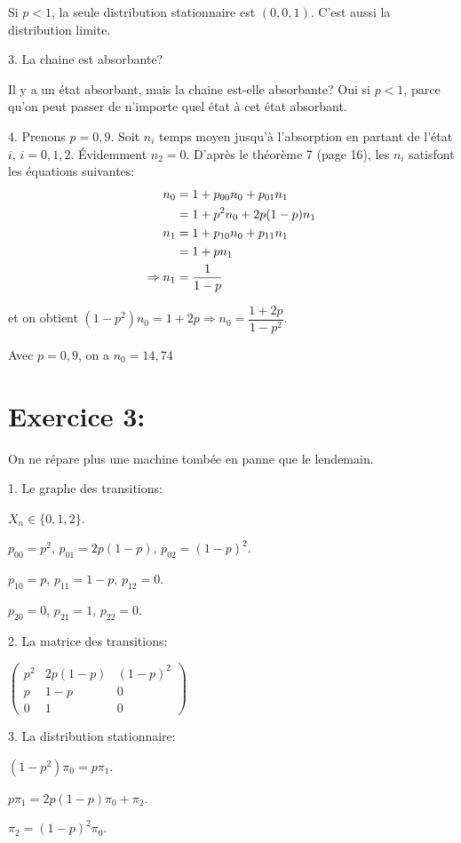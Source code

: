 \documentclass[a4paper,twoside,12pt]{article}
\begin{document}
Si $p<1$, la seule distribution stationnaire est $(0, 0, 1)$. C'est aussi la distribution limite.

3. La chaine est absorbante?

Il y a un état absorbant, mais la chaine est-elle absorbante? Oui si $p < 1$, parce qu'on peut passer de n'importe quel état à cet état absorbant.

4. Prenons $p = 0,9$. Soit $n_i$ temps moyen jusqu'à l'absorption en partant de l'état $i$, $i = 0, 1, 2$. Évidemment $n_2 = 0$. D'après le théorème 7 (page 16), les $n_i$ satisfont les équations suivantes:
\begin{align}
    n_0 &= 1 + p_{00}n_0 + p_{01}n_1 \notag \\
    &= 1 + p^2n_0 + 2p(1-p)n_1 \notag \\
    n_1 &= 1 + p_{10}n_0 + p_{11}n_1 \notag \\
    &= 1 + pn_1 \notag \\
    \Rightarrow n_1 &= \dfrac{1}{1-p} \notag
\end{align}

et on obtient $(1-p^2)n_0 = 1+2p \Rightarrow n_0 = \dfrac{1+2p}{1-p^2}$.

Avec $p=0,9$, on a $n_0 = 14,74$

\section{Exercice 3:}
On ne répare plus une machine tombée en panne que le lendemain.

1. Le graphe des transitions:

$X_n \in \{0, 1, 2\}$.

$p_{00} = p^2$, $p_{01} = 2p(1-p)$, $p_{02} = (1-p)^2$.

$p_{10} = p$, $p_{11} = 1-p$, $p_{12} = 0$.

$p_{20} = 0$, $p_{21} = 1$, $p_{22} = 0$.

2. La matrice des transitions:

$\left(
\begin{array}{ccc}
    p^2 & 2p(1-p) & (1-p)^2 \\
    p & 1-p & 0 \\
    0 & 1 & 0
\end{array}\right)$

3. La distribution stationnaire:

$(1-p^2)\pi_0 = p\pi_1$.

$p\pi_1 = 2p(1-p)\pi_0 + \pi_2$.

$\pi_2 = (1-p)^2\pi_0$.
\end{document}
